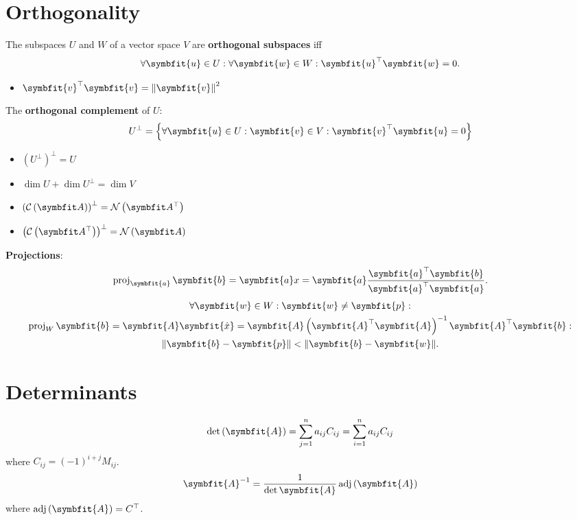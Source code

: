 \documentclass{article}
\begin{document}
\begin{minipage}[t]{62.39259259mm}
    \section*{Orthogonality}
    The subspaces $U$ and $W$ of a vector space $V$ are
    \textbf{orthogonal subspaces} iff
    \begin{equation*}
        \forall \symbfit{u}\in U:\forall \symbfit{w}\in W:\symbfit{u}^{\top}\symbfit{w} = 0.
    \end{equation*}
    \begin{itemize}
        \item $\symbfit{v}^\top \symbfit{v}=\norm{\symbfit{v}}^2$
    \end{itemize}
    The \textbf{orthogonal complement} of $U$:
    \begin{equation*}
        U^{\perp} = \left\{ \forall \symbfit{u}\in U:\symbfit{v}\in V: \symbfit{v}^{\top}\symbfit{u}=0 \right\}
    \end{equation*}
    \begin{itemize}
        \item $\left( U^{\perp} \right)^{\perp} = U$
        \item $\dim{U} + \dim{U^{\perp}} = \dim{V}$
        \item $\left( \columnspace{A} \right)^\perp = \leftnullspace{A}$
        \item $\left( \rowspace{A} \right)^\perp = \nullspace{A}$
    \end{itemize}
    \textbf{Projections}:
    \begin{equation*}
        \proj_{\symbfit{a}}\symbfit{b}
        = \symbfit{a} x
        = \symbfit{a} \frac{\symbfit{a}^\top \symbfit{b}}{\symbfit{a}^\top \symbfit{a}}.
    \end{equation*}
    \begin{gather*}
        \forall \symbfit{w}\in W:\symbfit{w}\neq \symbfit{p}: \\
        \proj_{W}\symbfit{b} = \symbfit{A}\symbfit{\hat{x}} = \symbfit{A}\left( \symbfit{A}^\top \symbfit{A} \right)^{-1}\symbfit{A}^\top \symbfit{b}: \\
        \norm{\symbfit{b}-\symbfit{p}}<\norm{\symbfit{b}-\symbfit{w}}.
    \end{gather*}
    \section*{Determinants}
    \begin{equation*}
        \det{\left( \symbfit{A} \right)} = \sum_{j=1}^n a_{ij}C_{ij} = \sum_{i=1}^n a_{ij}C_{ij}
    \end{equation*}
    where $C_{ij}=\left( -1 \right)^{i+j}M_{ij}$.
    \begin{equation*}
        \symbfit{A}^{-1}=\frac{1}{\det{\symbfit{A}}} \adj{\left( \symbfit{A} \right)}
    \end{equation*}
    where $\adj{\left( \symbfit{A} \right)}=C^\top$.
\end{minipage}\hfill%
\end{document}
